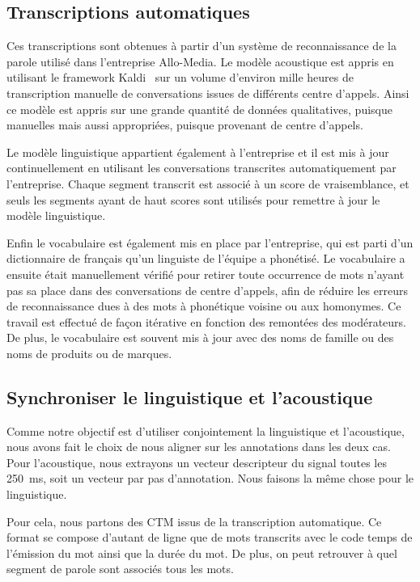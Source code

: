 \subsection{Transcriptions automatiques}
Ces transcriptions sont obtenues à partir d'un système de reconnaissance de la parole utilisé dans l'entreprise Allo-Media. Le modèle acoustique est appris en utilisant le framework Kaldi~\cite{Povey2011} sur un volume d'environ mille heures de transcription manuelle de conversations issues de différents centre d'appels. Ainsi ce modèle est appris sur une grande quantité de données qualitatives, puisque manuelles mais aussi appropriées, puisque provenant de centre d'appels.

Le modèle linguistique appartient également à l'entreprise et il est mis à jour continuellement en utilisant les conversations transcrites automatiquement par l'entreprise. Chaque segment transcrit est associé à un score de vraisemblance, et seuls les segments ayant de haut scores sont utilisés pour remettre à jour le modèle linguistique.

Enfin le vocabulaire est également mis en place par l'entreprise, qui est parti d'un dictionnaire de français qu'un linguiste de l'équipe a phonétisé. Le vocabulaire a ensuite était manuellement vérifié pour retirer toute occurrence de mots n'ayant pas sa place dans des conversations de centre d'appels, afin de réduire les erreurs de reconnaissance dues à des mots à phonétique voisine ou aux homonymes. Ce travail est effectué de façon itérative en fonction des remontées des modérateurs. De plus, le vocabulaire est souvent mis à jour avec des noms de famille ou des noms de produits ou de marques.

\subsection{Synchroniser le linguistique et l'acoustique}
Comme notre objectif est d'utiliser conjointement la linguistique et l'acoustique, nous avons fait le choix de nous aligner sur les annotations dans les deux cas. Pour l'acoustique, nous extrayons un vecteur descripteur du signal toutes les 250~ms, soit un vecteur par pas d'annotation. Nous faisons la même chose pour le linguistique.

Pour cela, nous partons des CTM issus de la transcription automatique. Ce format se compose d'autant de ligne que de mots transcrits avec le code temps de l'émission du mot ainsi que la durée du mot. De plus, on peut retrouver à quel segment de parole sont associés tous les mots.

